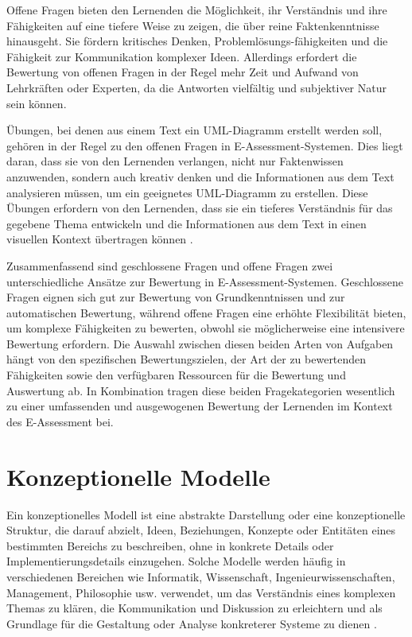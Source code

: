 Offene Fragen bieten den Lernenden die Möglichkeit, ihr Verständnis und ihre Fähigkeiten auf eine tiefere Weise zu zeigen, die über reine Faktenkenntnisse hinausgeht. Sie fördern kritisches Denken, Problemlösungs-fähigkeiten und die Fähigkeit zur Kommunikation komplexer Ideen. Allerdings erfordert die Bewertung von offenen Fragen in der Regel mehr Zeit und Aufwand von Lehrkräften oder Experten, da die Antworten vielfältig und subjektiver Natur sein können.


Übungen, bei denen aus einem Text ein \ac{UML}-Diagramm erstellt werden soll, gehören in der Regel zu den offenen Fragen in E-Assessment-Systemen. Dies liegt daran, dass sie von den Lernenden verlangen, nicht nur Faktenwissen anzuwenden, sondern auch kreativ denken und die Informationen aus dem Text analysieren müssen, um ein geeignetes \ac{UML}-Diagramm zu erstellen.  Diese Übungen erfordern von den Lernenden, dass sie ein tieferes Verständnis für das gegebene Thema entwickeln und die Informationen aus dem Text in einen visuellen Kontext übertragen können \cite{ullrich2021automated}.

Zusammenfassend sind geschlossene Fragen und offene Fragen zwei unterschiedliche Ansätze zur Bewertung in E-Assessment-Systemen. Geschlossene Fragen eignen sich gut zur Bewertung von Grundkenntnissen und zur automatischen Bewertung, während offene Fragen eine erhöhte Flexibilität bieten, um komplexe Fähigkeiten zu bewerten, obwohl sie möglicherweise eine intensivere Bewertung erfordern. Die Auswahl zwischen diesen beiden Arten von Aufgaben hängt von den spezifischen Bewertungszielen, der Art der zu bewertenden Fähigkeiten sowie den verfügbaren Ressourcen für die Bewertung und Auswertung ab. In Kombination tragen diese beiden Fragekategorien wesentlich zu einer umfassenden und ausgewogenen Bewertung der Lernenden im Kontext des E-Assessment bei.


\section{Konzeptionelle Modelle}
Ein konzeptionelles Modell ist eine abstrakte Darstellung oder eine konzeptionelle Struktur, die darauf abzielt, Ideen, Beziehungen, Konzepte oder Entitäten eines bestimmten Bereichs zu beschreiben, ohne in konkrete Details oder Implementierungsdetails einzugehen. Solche Modelle werden häufig in verschiedenen Bereichen wie Informatik, Wissenschaft, Ingenieurwissenschaften, Management, Philosophie usw. verwendet, um das Verständnis eines komplexen Themas zu klären, die Kommunikation und Diskussion zu erleichtern und als Grundlage für die Gestaltung oder Analyse konkreterer Systeme zu dienen \cite{abramowicz2013business}.

